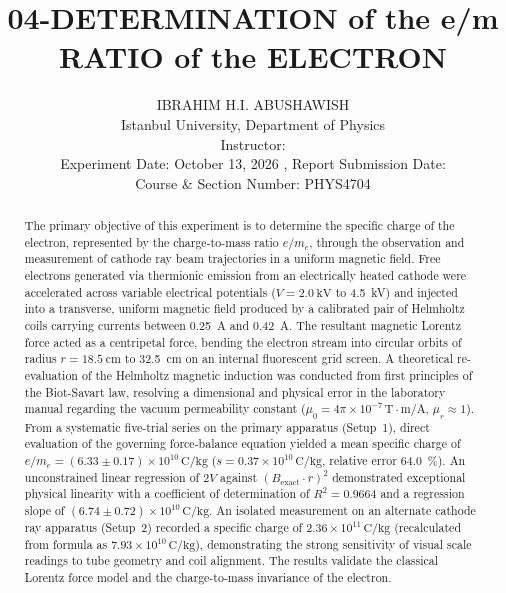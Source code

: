 \documentclass[journal]{IEEEtran}
\begin{document}
\title{04-DETERMINATION of the e/m RATIO of the ELECTRON}
\author{IBRAHIM H.I. ABUSHAWISH \\
Istanbul University, Department of Physics \\
Instructor: \\
Experiment Date: October 13, 2026 , Report Submission Date: \\
Course \& Section Number: PHYS4704}


\maketitle

\begin{abstract}
The primary objective of this experiment is to determine the specific charge of the electron, represented by the charge-to-mass ratio $e/m_e$, through the observation and measurement of cathode ray beam trajectories in a uniform magnetic field. Free electrons generated via thermionic emission from an electrically heated cathode were accelerated across variable electrical potentials ($V = \SI{2.0}{\kilo\volt}$ to \SI{4.5}{\kilo\volt}) and injected into a transverse, uniform magnetic field produced by a calibrated pair of Helmholtz coils carrying currents between \SI{0.25}{\ampere} and \SI{0.42}{\ampere}. The resultant magnetic Lorentz force acted as a centripetal force, bending the electron stream into circular orbits of radius $r = \SI{18.5}{\centi\meter}$ to \SI{32.5}{\centi\meter} on an internal fluorescent grid screen. A theoretical re-evaluation of the Helmholtz magnetic induction was conducted from first principles of the Biot-Savart law, resolving a dimensional and physical error in the laboratory manual regarding the vacuum permeability constant ($\mu_0 = 4\pi \times 10^{-7}\,\mathrm{T\cdot m/A}$, $\mu_r \approx 1$). From a systematic five-trial series on the primary apparatus (Setup~1), direct evaluation of the governing force-balance equation yielded a mean specific charge of $e/m_e = (6.33 \pm 0.17) \times 10^{10}\,\mathrm{C/kg}$ ($s = 0.37 \times 10^{10}\,\mathrm{C/kg}$, relative error \SI{64.0}{\percent}). An unconstrained linear regression of $2V$ against $(B_{\text{exact}} \cdot r)^2$ demonstrated exceptional physical linearity with a coefficient of determination of $R^2 = 0.9664$ and a regression slope of $(6.74 \pm 0.72) \times 10^{10}\,\mathrm{C/kg}$. An isolated measurement on an alternate cathode ray apparatus (Setup~2) recorded a specific charge of $2.36 \times 10^{11}\,\mathrm{C/kg}$ (recalculated from formula as $7.93 \times 10^{10}\,\mathrm{C/kg}$), demonstrating the strong sensitivity of visual scale readings to tube geometry and coil alignment. The results validate the classical Lorentz force model and the charge-to-mass invariance of the electron.
\end{abstract}
\end{document}
